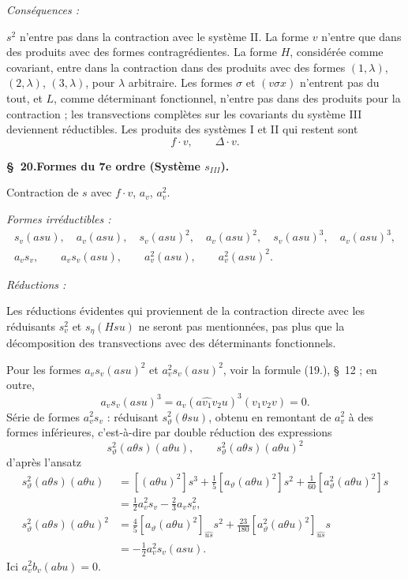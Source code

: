 \documentclass[11pt]{article}
\begin{document}
\noindent\emph{Conséquences :}

$s^2$ n'entre pas dans la contraction avec le système II. La forme $v$ n'entre que dans des produits avec des formes contragrédientes. La forme $H$, considérée comme covariant, entre dans la contraction dans des produits avec des formes $(1,\lambda)$, $(2,\lambda)$, $(3,\lambda)$, pour $\lambda$ arbitraire. Les formes $\sigma$ et $(v\sigma x)$ n'entrent pas du tout, et $L$, comme déterminant fonctionnel, n'entre pas dans des produits pour la contraction ; les transvections complètes sur les covariants du système III deviennent réductibles. Les produits des systèmes I et II qui restent sont
\[
f\cdot v,\qquad \Delta\cdot v.
\]

\begin{center}
\textbf{\S\ 20.\quad Formes du 7e ordre (Système $s_{III}$).}
\end{center}

Contraction de $s$ avec $f\cdot v$, $a_v$, $a_v^2$.

\noindent\emph{Formes irréductibles :}
\[
\begin{gathered}
s_v(asu),\quad a_v(asu),\quad s_v(asu)^2,\quad a_v(asu)^2,\quad
s_v(asu)^3,\quad a_v(asu)^3,\\
a_v s_v,\qquad a_v s_v(asu),\qquad a_v^2(asu),\qquad a_v^2(asu)^2.
\end{gathered}
\]

\noindent\emph{Réductions :}

Les réductions évidentes qui proviennent de la contraction directe avec les réduisants $s_v^2$ et $s_\eta(Hsu)$ ne seront pas mentionnées, pas plus que la décomposition des transvections avec des déterminants fonctionnels.

Pour les formes $a_v s_v(asu)^2$ et $a_v^2s_v(asu)^2$, voir la formule (19.), \S\ 12 ; en outre,
\[
a_v s_v(asu)^3=a_v(a\widehat{v_1}v_2u)^3(v_1v_2v)=0.
\]
Série de formes $a_v^2s_v$ : réduisant $s_\vartheta^2(\theta su)$, obtenu en remontant de $a_v^2$ à des formes inférieures, c'est-à-dire par double réduction des expressions
\[
s_\vartheta^2(a\theta s)(a\theta u),\qquad
s_\vartheta^2(a\theta s)(a\theta u)^2
\]
d'après l'ansatz
\[
\begin{aligned}
s_\vartheta^2(a\theta s)(a\theta u)
&=[(a\theta u)^2]s^3+\frac15[a_\vartheta(a\theta u)^2]s^2+\frac1{60}[a_\vartheta^2(a\theta u)^2]s\\
&=\frac12a_v^2s_v-\frac23a_v s_v^2,\\
s_\vartheta^2(a\theta s)(a\theta u)^2
&=\frac45[a_\vartheta(a\theta u)^2]_{\widehat{us}}s^2+\frac{23}{180}[a_\vartheta^2(a\theta u)^2]_{\widehat{us}}s\\
&=-\frac12a_v^2s_v(asu).
\end{aligned}
\]
Ici $a_v^2b_v(abu)=0$.
\end{document}
